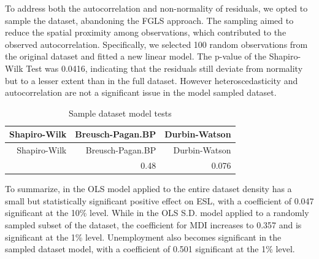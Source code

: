 \documentclass[
  letterpaper,
  DIV=11,
  numbers=noendperiod,
  abstract]{scrartcl}
\begin{document}
To address both the autocorrelation and non-normality of residuals, we
opted to sample the dataset, abandoning the FGLS approach. The sampling
aimed to reduce the spatial proximity among observations, which
contributed to the observed autocorrelation. Specifically, we selected
100 random observations from the original dataset and fitted a new
linear model. The p-value of the Shapiro-Wilk Test was 0.0416,
indicating that the residuals still deviate from normality but to a
lesser extent than in the full dataset. However heteroscedasticity and
autocorrelation are not a significant issue in the model sampled
dataset.

\begin{longtable}[]{@{}rrr@{}}
\caption{Sample dataset model tests}\tabularnewline
\toprule\noalign{}
Shapiro-Wilk & Breusch-Pagan.BP & Durbin-Watson \\
\midrule\noalign{}
\endfirsthead
\toprule\noalign{}
Shapiro-Wilk & Breusch-Pagan.BP & Durbin-Watson \\
\midrule\noalign{}
\endhead
\bottomrule\noalign{}
\endlastfoot
0.042 & 0.48 & 0.076 \\
\end{longtable}

To summarize, in the OLS model applied to the entire dataset density has
a small but statistically significant positive effect on ESL, with a
coefficient of 0.047 significant at the 10\% level. While in the OLS
S.D. model applied to a randomly sampled subset of the dataset, the
coefficient for MDI increases to 0.357 and is significant at the 1\%
level. Unemployment also becomes significant in the sampled dataset
model, with a coefficient of 0.501 significant at the 1\% level.
\end{document}
